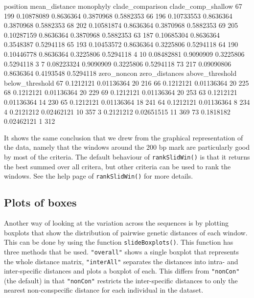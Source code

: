\documentclass{article}
\newcommand{\fun}[1]{\texttt{#1}}
\begin{document}
\begin{Routput}
   position mean_distance monophyly clade_comparison clade_comp_shallow
67      199    0.10878089 0.8636364        0.3870968          0.5882353
66      196    0.10733553 0.8636364        0.3870968          0.5882353
68      202    0.10581874 0.8636364        0.3870968          0.5882353
69      205    0.10287159 0.8636364        0.3870968          0.5882353
63      187    0.10685304 0.8636364        0.3548387          0.5294118
65      193    0.10453572 0.8636364        0.3225806          0.5294118
64      190    0.10446778 0.8636364        0.3225806          0.5294118
4        10    0.08482881 0.9090909        0.3225806          0.5294118
3         7    0.08223324 0.9090909        0.3225806          0.5294118
73      217    0.09090806 0.8636364        0.4193548          0.5294118
   zero_noncon zero_distances above_threshold below_threshold
67   0.1212121     0.01136364              20             216
66   0.1212121     0.01136364              20             225
68   0.1212121     0.01136364              20             229
69   0.1212121     0.01136364              20             253
63   0.1212121     0.01136364              14             230
65   0.1212121     0.01136364              18             241
64   0.1212121     0.01136364               8             234
4    0.2121212     0.02462121              10             357
3    0.2121212     0.02651515              11             369
73   0.1818182     0.02462121               1             312
\end{Routput}

It shows the same conclusion that we drew from the graphical representation of the data, namely that the windows around the 200 bp mark are particularly good by most of the criteria. The default behaviour of \fun{rankSlidWin()} is that it returns the best summed over all critera, but other criteria can be used to rank the windows. See the help page of \fun{rankSlidWin()} for more details.

\subsection{Plots of boxes}
Another way of looking at the variation across the sequences is by plotting boxplots that show the distribution of pairwise genetic distances of each window. This can be done by using the function \fun{slideBoxplots()}. This function has three methods that be used. \fun{"overall"} shows a single boxplot that represents the whole distance matrix, \fun{"interAll"} separates the distances into intra- and inter-specific distances and plots a boxplot of each. This differs from \fun{"nonCon"} (the default) in that \fun{"nonCon"} restricts the inter-specific distances to only the nearest non-conspecific distance for each individual in the dataset.
\end{document}

